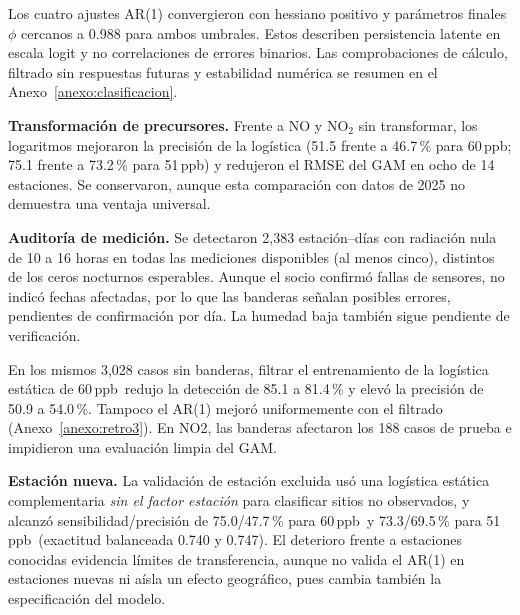 \documentclass[11pt,letterpaper]{article}
\newcommand{\ppb}{\,ppb}
\newenvironment{cambio}{}{}
\begin{document}
Los cuatro ajustes AR(1) convergieron con hessiano positivo y parámetros finales $\phi$ cercanos a 0.988 para ambos umbrales. Estos describen persistencia latente en escala logit y no correlaciones de errores binarios. Las comprobaciones de cálculo, filtrado sin respuestas futuras y estabilidad numérica se resumen en el Anexo~\ref{anexo:clasificacion}.

\textbf{Transformación de precursores.} Frente a NO y NO$_2$ sin transformar, los logaritmos mejoraron la precisión de la logística (51.5 frente a 46.7\,\% para 60\ppb; 75.1 frente a 73.2\,\% para 51\ppb) y redujeron el RMSE del GAM en ocho de 14 estaciones. Se conservaron, aunque esta comparación con datos de 2025 no demuestra una ventaja universal.

\textbf{Auditoría de medición.} Se detectaron 2,383 estación--días con radiación nula de 10 a 16 horas en todas las mediciones disponibles (al menos cinco), distintos de los ceros nocturnos esperables. Aunque el socio confirmó fallas de sensores, no indicó fechas afectadas, por lo que las banderas señalan posibles errores, pendientes de confirmación por día. La humedad baja también sigue pendiente de verificación.


\begin{cambio}
En los mismos 3,028 casos sin banderas, filtrar el entrenamiento de la logística estática de 60\ppb\ redujo la detección de 85.1 a 81.4\,\% y elevó la precisión de 50.9 a 54.0\,\%. Tampoco el AR(1) mejoró uniformemente con el filtrado (Anexo~\ref{anexo:retro3}). En NO2, las banderas afectaron los 188 casos de prueba e impidieron una evaluación limpia del GAM.
\end{cambio}


\textbf{Estación nueva.} La validación de estación excluida usó una logística estática complementaria \emph{sin el factor estación} para clasificar sitios no observados, y alcanzó sensibilidad/precisión de 75.0/47.7\,\% para 60\ppb\ y 73.3/69.5\,\% para 51\ppb\ (exactitud balanceada 0.740 y 0.747). El deterioro frente a estaciones conocidas evidencia límites de transferencia, aunque no valida el AR(1) en estaciones nuevas ni aísla un efecto geográfico, pues cambia también la especificación del modelo.
\par

\clearpage
\end{document}
